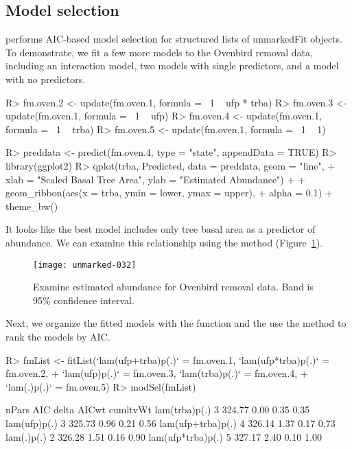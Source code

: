 \documentclass[article,shortnames]{jss}
\begin{document}
{\subsection{Model selection}

 performs AIC-based model selection for structured lists of
unmarkedFit objects.  To demonstrate, we fit a few more models to the Ovenbird
removal data, including an interaction model, two models with
single predictors, and a model with no predictors.

\begin{Schunk}
\begin{Sinput}
R> fm.oven.2 <- update(fm.oven.1, formula = ~1 ~ ufp * trba)
R> fm.oven.3 <- update(fm.oven.1, formula = ~1 ~ ufp)
R> fm.oven.4 <- update(fm.oven.1, formula = ~1 ~ trba)
R> fm.oven.5 <- update(fm.oven.1, formula = ~1 ~ 1)
\end{Sinput}
\end{Schunk}


\begin{Schunk}
\begin{Sinput}
R> preddata <- predict(fm.oven.4, type = "state", appendData = TRUE)
R> library(ggplot2)
R> qplot(trba, Predicted, data = preddata, geom = "line", 
+     xlab = "Scaled Basal Tree Area", ylab = "Estimated Abundance") + 
+     geom_ribbon(aes(x = trba, ymin = lower, ymax = upper), 
+         alpha = 0.1) + theme_bw()
\end{Sinput}
\end{Schunk}




It looks like the best model includes only tree basal area as a
predictor of abundance.  We can examine this relationship using
the  method (Figure~\ref{fig:pred}).


\begin{figure}[th!]
  \centering
\texttt{[image: unmarked-032]}
\caption{Examine estimated abundance for Ovenbird removal data.  Band
  is 95\% confidence interval.}
\label{fig:pred}
\end{figure}


Next, we organize the fitted models with the  function and
the use the  method to rank the models by AIC.

\begin{Schunk}
\begin{Sinput}
R> fmList <- fitList(`lam(ufp+trba)p(.)` = fm.oven.1, `lam(ufp*trba)p(.)` = fm.oven.2, 
+     `lam(ufp)p(.)` = fm.oven.3, `lam(trba)p(.)` = fm.oven.4, 
+     `lam(.)p(.)` = fm.oven.5)
R> modSel(fmList)
\end{Sinput}
\begin{Soutput}
                  nPars    AIC delta AICwt cumltvWt
lam(trba)p(.)         3 324.77  0.00  0.35     0.35
lam(ufp)p(.)          3 325.73  0.96  0.21     0.56
lam(ufp+trba)p(.)     4 326.14  1.37  0.17     0.73
lam(.)p(.)            2 326.28  1.51  0.16     0.90
lam(ufp*trba)p(.)     5 327.17  2.40  0.10     1.00
\end{Soutput}
\end{Schunk}



}
\end{document}
